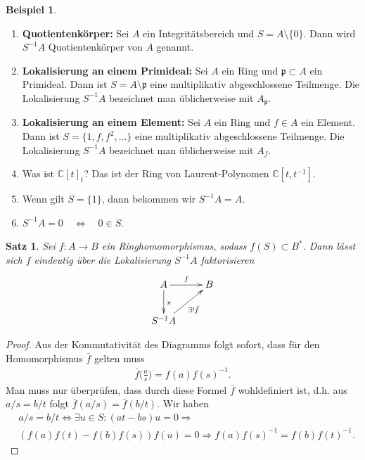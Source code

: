 \documentclass[reqno,12pt]{article}
\numberwithin{equation}{section}
\newcommand{\bC}{\mathbb{C}}
\theoremstyle{plain}
\newtheorem{proposition}[thm]{Satz}
\theoremstyle{definition}
\newtheorem{example}[thm]{Beispiel}
\begin{document}
\begin{example}
\
\begin{enumerate}
\item {\bf Quotientenkörper:} Sei $A$ ein Integritätsbereich und $S = A \setminus \{0\}$. Dann wird $S^{-1}A$ Quotientenkörper von $A$ genannt.

\item {\bf Lokalisierung an einem Primideal:} Sei $A$ ein Ring und $\mathfrak{p} \subset A$ ein Primideal. Dann ist $S = A \setminus \mathfrak{p}$ eine multiplikativ abgeschlossene Teilmenge. Die Lokalisierung $S^{-1}A$ bezeichnet man üblicherweise mit $A_{\mathfrak{p}}$.

\item {\bf Lokalisierung an einem Element:} Sei $A$ ein Ring und $f \in A$ ein Element. Dann ist $S = \{1, f, f^2, \dots \}$ eine multiplikativ abgeschlossene Teilmenge. Die Lokalisierung $S^{-1}A$ bezeichnet man üblicherweise mit $A_f$.

\item Was ist $\bC[t]_t$? Das ist der Ring von Laurent-Polynomen $\bC[t, t^{-1}]$.

\item Wenn gilt $S=\{ 1 \}$, dann bekommen wir $S^{-1}A = A$.

\item $S^{-1}A = 0 \quad \iff \quad 0 \in S$.

\end{enumerate}
\end{example}

\begin{proposition}
Sei $f\colon A \to B$ ein Ringhomomorphismus, sodass $f(S) \subset B^*$. Dann lässt sich $f$ eindeutig über die Lokalisierung $S^{-1}A$ faktorisieren
\begin{align*}
\xymatrix{
A \ar[r]^f \ar[d]^{\pi} & B \\
S^{-1}A \ar[ur]_{\exists ! \bar{f}}
}
\end{align*}
\end{proposition}

\begin{proof}
Aus der Kommutativität des Diagramms folgt sofort, dass für den Homomorphismus $\bar{f}$ gelten muss
\begin{align*}
\bar{f}\Big(\frac{a}{s}\Big) = f(a)f(s)^{-1}.
\end{align*}
Man muss nur überprüfen, dass durch diese Formel $\bar{f}$ wohldefiniert ist, d.h. aus $a/s = b/t$ folgt $\bar{f}(a/s)=\bar{f}(b/t)$. Wir haben
\begin{align*}
& a/s = b/t \iff \exists u \in S \colon (at-bs)u=0 \Rightarrow  \\
& (f(a)f(t)-f(b)f(s))f(u) = 0 \Rightarrow f(a)f(s)^{-1} = f(b)f(t)^{-1}.
\end{align*}
\end{proof}
\end{document}
